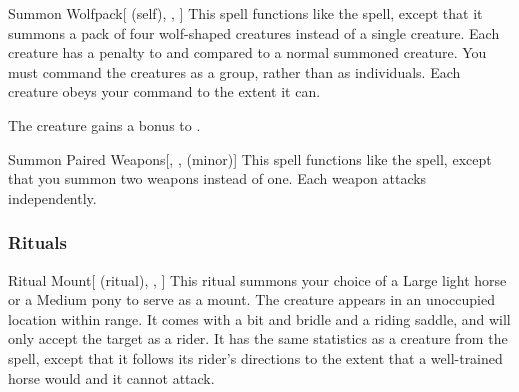 \lowercase{\hypertarget{spell:Summon Wolfpack}{}}\label{spell:Summon Wolfpack}
\begin{attuneability}[Rank 5]{\hypertarget{spell:Summon Wolfpack}{Summon Wolfpack}}[ (self), , ]
This spell functions like the  spell, except that it summons a pack of four wolf-shaped creatures instead of a single creature.
Each creature has a  penalty to  and  compared to a normal summoned creature.
You must command the creatures as a group, rather than as individuals.
Each creature obeys your command to the extent it can.

\rankline
{} The creature gains a  bonus to .
\end{attuneability}
\vspace{0.25em}



\lowercase{\hypertarget{spell:Summon Paired Weapons}{}}\label{spell:Summon Paired Weapons}
\begin{freeability}[Rank 8]{\hypertarget{spell:Summon Paired Weapons}{Summon Paired Weapons}}[, ,  (minor)]
This spell functions like the  spell, except that you summon two weapons instead of one.
Each weapon attacks independently.
\end{freeability}
\vspace{0.25em}



\subsubsection{Rituals}


\lowercase{\hypertarget{spell:Ritual Mount}{}}\label{spell:Ritual Mount}
\begin{attuneability}[Rank 3]{\hypertarget{spell:Ritual Mount}{Ritual Mount}}[ (ritual), , ]
This ritual summons your choice of a Large light horse or a Medium pony to serve as a mount.
The creature appears in an unoccupied location within \rngmed range.
It comes with a bit and bridle and a riding saddle, and will only accept the target as a rider.
It has the same statistics as a creature from the  spell, except that it follows its rider's directions to the extent that a well-trained horse would and it cannot attack.
\end{attuneability}
\vspace{0.25em}



